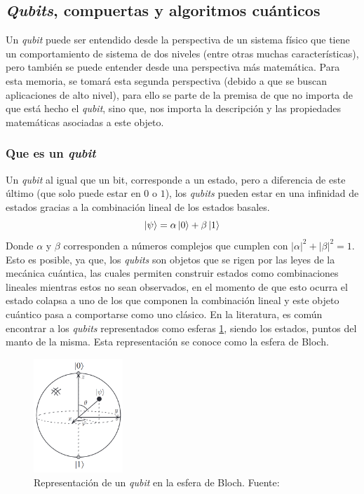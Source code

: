
\subsection{\textit{Qubits}, compuertas y algoritmos cuánticos}

Un \textit{qubit} puede ser entendido desde la perspectiva de un sistema físico que tiene un comportamiento de sistema de dos niveles (entre otras muchas características), pero también se puede entender desde una perspectiva más matemática. Para esta memoria, se tomará esta segunda perspectiva (debido a que se buscan aplicaciones de alto nivel), para ello se parte de la premisa de que no importa de que está hecho el \textit{qubit}, sino que, nos importa la descripción y las propiedades matemáticas asociadas a este objeto.

\subsubsection{Que es un \textit{qubit}}
Un \textit{qubit} al igual que un bit, corresponde a un estado, pero a diferencia de este último (que solo puede estar en $0$ o $1$), los \textit{qubits} pueden estar en una infinidad de estados gracias a la combinación lineal de los estados basales. 
\begin{equation*}
    \ket{\psi} = \alpha \ket{0} + \beta \ket{1}
\end{equation*}
Donde $\alpha$ y $\beta$ corresponden a números complejos que cumplen con $|\alpha|^2 + |\beta|^2 = 1$. Esto es posible, ya que, los \textit{qubits} son objetos que se rigen por las leyes de la mecánica cuántica, las cuales permiten construir estados como combinaciones lineales mientras estos no sean observados, en el momento de que esto ocurra el estado colapsa a uno de los que componen la combinación lineal y este objeto cuántico pasa a comportarse como uno clásico. En la literatura, es común encontrar a los \textit{qubits} representados como esferas \ref{fig:EsferaBloch}, siendo los estados, puntos del manto de la misma. Esta representación se conoce como la esfera de Bloch.

\begin{figure}[H]
\centering
\includegraphics[width=0.3\textwidth]{figures/S2/ESFERABLOCH.png}
\caption{\label{fig:EsferaBloch} Representación de un \textit{qubit} en la esfera de Bloch. Fuente: \cite{nielsen_chuang_2010}}
\end{figure}

